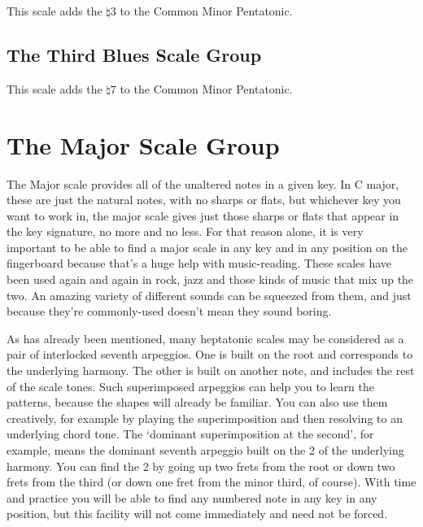 \documentclass[english]{./gbook}
\begin{document}
\begin{large}
This scale adds the $\natural 3$ to the Common Minor Pentatonic.


\subsection*{The Third Blues Scale Group}

This scale adds the $\natural 7$ to the Common Minor Pentatonic.



\section{The Major Scale Group}
The Major scale provides all of the unaltered notes in a given key. In C major, these are just the natural notes, with no sharps or flats, but whichever key you want to work in, the major scale gives just those sharps or flats that appear in the key signature, no more and no less. For that reason alone, it is very important to be able to find a major scale in any key and in any position on the fingerboard because that's a huge help with music-reading. These scales have been used again and again in rock, jazz and those kinds of music that mix up the two. An amazing variety of different sounds can be squeezed from them, and just because they're commonly-used doesn't mean they sound boring.

As has already been mentioned, many heptatonic scales may be considered as a pair of interlocked seventh arpeggios. One is built on the root and corresponds to the underlying harmony. The other is built on another note, and includes the rest of the scale tones. Such superimposed arpeggios can help you to learn the patterns, because the shapes will already be familiar. You can also use them creatively, for example by playing the superimposition and then resolving to an underlying chord tone. The `dominant superimposition at the second', for example, means the dominant seventh arpeggio built on the 2 of the underlying harmony. You can find the 2 by going up two frets from the root or down two frets from the third (or down one fret from the minor third, of course). With time and practice you will be able to find any numbered note in any key in any position, but this facility will not come immediately and need not be forced.


\end{large}
\end{document}
